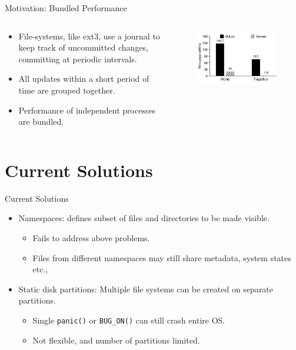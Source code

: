 \documentclass[aspectratio=169]{beamer}
\newcommand{\bi}{\begin{itemize}}
\newcommand{\ei}{\end{itemize}}
\begin{document}
\begin{frame}{Motivation: Bundled Performance}
    \begin{columns}[T]
        \begin{column}{0.4\textwidth}
            \bi
        \item File-systems, like ext3, use a journal to keep track of uncommitted changes,
            committing at periodic intervals.
        \item All updates within a short period of time are grouped together.
        \item Performance of independent processes are bundled.
            \ei
    \end{column}
    \begin{column}{0.2\textwidth}
        \pause
        \begin{figure}
            \includegraphics[scale=0.3]{./figures/fig2.png}
        \end{figure}
    \end{column}
\end{columns}
\end{frame}

\section{Current Solutions}
\begin{frame}{Current Solutions}
    \bi
\item Namespaces: defines subset of files and directories to be made visible.
    \pause
    \bi
\item Fails to address above problems.
\item Files from different namespaces may still share metadata, system states
    etc.,
    \ei
    \pause
\item Static disk partitions: Multiple file systems can be created on separate
    partitions.
    \pause
    \bi
\item Single \texttt{panic()} or \texttt{BUG\_ON()} can still crash entire OS.
\item Not flexible, and number of partitions limited.
    \ei
    \ei
\end{frame}
\end{document}
